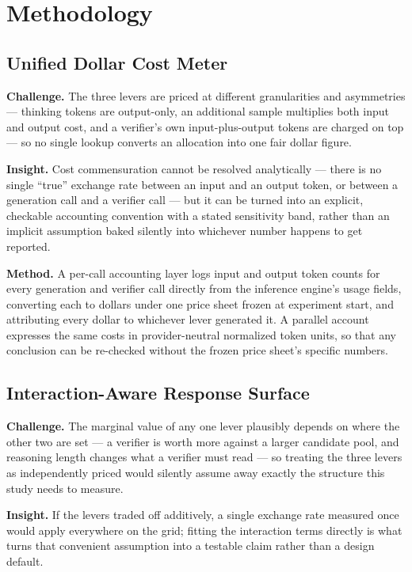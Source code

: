 \documentclass[11pt]{article}
\begin{document}
\section{Methodology}

\subsection{Unified Dollar Cost Meter}
\textbf{Challenge.} The three levers are priced at different granularities and asymmetries --- thinking tokens are output-only, an additional sample multiplies both input and output cost, and a verifier's own input-plus-output tokens are charged on top --- so no single lookup converts an allocation into one fair dollar figure.

\textbf{Insight.} Cost commensuration cannot be resolved analytically --- there is no single ``true'' exchange rate between an input and an output token, or between a generation call and a verifier call --- but it can be turned into an explicit, checkable accounting convention with a stated sensitivity band, rather than an implicit assumption baked silently into whichever number happens to get reported.

\textbf{Method.} A per-call accounting layer logs input and output token counts for every generation and verifier call directly from the inference engine's usage fields, converting each to dollars under one price sheet frozen at experiment start, and attributing every dollar to whichever lever generated it. A parallel account expresses the same costs in provider-neutral normalized token units, so that any conclusion can be re-checked without the frozen price sheet's specific numbers.

\subsection{Interaction-Aware Response Surface}
\textbf{Challenge.} The marginal value of any one lever plausibly depends on where the other two are set --- a verifier is worth more against a larger candidate pool, and reasoning length changes what a verifier must read --- so treating the three levers as independently priced would silently assume away exactly the structure this study needs to measure.

\textbf{Insight.} If the levers traded off additively, a single exchange rate measured once would apply everywhere on the grid; fitting the interaction terms directly is what turns that convenient assumption into a testable claim rather than a design default.
\end{document}
